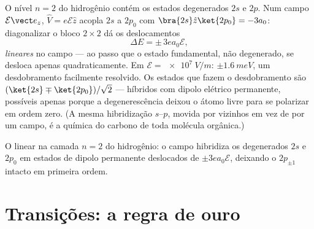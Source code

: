\begin{example}\label{ex:b3:perturbation-theory:stark}
O nível $n = 2$ do hidrogênio contém os estados degenerados $2s$ e $2p$.
Num campo $\mathcal E\vect e_z$, $\hat V = e\mathcal E\hat z$
acopla $2s$ a $2p_0$ com $\bra{2s}\hat z\ket{2p_0} = -3a_0$:
diagonalizar o bloco $2\times2$ dá os deslocamentos
\[
\Delta E = \pm\,3e a_0\mathcal E ,
\]
\emph{lineares} no campo --- ao passo que o estado fundamental, não
degenerado, se desloca apenas quadraticamente. Em
$\mathcal E = \qty{e7}{V/m}$: $\pm
\qty{1.6}{meV}$, um desdobramento facilmente resolvido. Os estados que
fazem o desdobramento são $(\ket{2s} \mp \ket{2p_0})/\sqrt2$ ---
híbridos com dipolo elétrico permanente, possíveis apenas porque a
degenerescência deixou o átomo livre para se polarizar em ordem zero.
(A mesma hibridização $s$--$p$, movida por vizinhos em vez de por um
campo, é a química do carbono de toda molécula orgânica.)
\end{example}

\begin{omfigure}

{\small O  linear na camada $n = 2$ do hidrogênio: o campo
hibridiza os degenerados $2s$ e $2p_0$ em estados de dipolo permanente
deslocados de $\pm3ea_0\mathcal E$, deixando o $2p_{\pm1}$ intacto em
primeira ordem.}
\end{omfigure}

\section{Transições: a regra de ouro}

